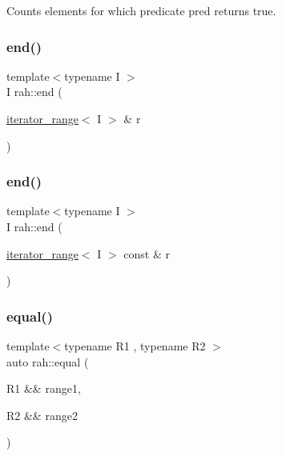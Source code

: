 Counts elements for which predicate pred returns true. 


\begin{DoxyCodeInclude}{0}
\end{DoxyCodeInclude}
\mbox{\label{namespacerah_aaddd1442cd76b96876e692cdefe7261d}} 
\subsubsection{\texorpdfstring{end()}{end()}\hspace{0.1cm}{\footnotesize\ttfamily [1/2]}}
{\footnotesize\ttfamily template$<$typename I $>$ \\
I rah\+::end (\begin{DoxyParamCaption}\item[{\mbox{\hyperlink{structrah_1_1iterator__range}{iterator\+\_\+range}}$<$ I $>$ \&}]{r }\end{DoxyParamCaption})}

\mbox{\label{namespacerah_a6b31fe80bf81abf3149df010cb265e20}} 
\subsubsection{\texorpdfstring{end()}{end()}\hspace{0.1cm}{\footnotesize\ttfamily [2/2]}}
{\footnotesize\ttfamily template$<$typename I $>$ \\
I rah\+::end (\begin{DoxyParamCaption}\item[{\mbox{\hyperlink{structrah_1_1iterator__range}{iterator\+\_\+range}}$<$ I $>$ const \&}]{r }\end{DoxyParamCaption})}

\mbox{\label{namespacerah_abf321dffb33d6a2d752aa091fdba7bbf}} 
\subsubsection{\texorpdfstring{equal()}{equal()}}
{\footnotesize\ttfamily template$<$typename R1 , typename R2 $>$ \\
auto rah\+::equal (\begin{DoxyParamCaption}\item[{R1 \&\&}]{range1,  }\item[{R2 \&\&}]{range2 }\end{DoxyParamCaption})}




